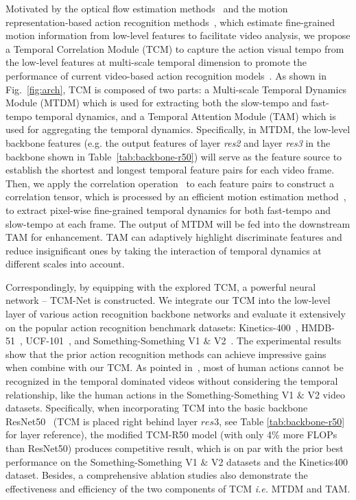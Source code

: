\documentclass[journal]{IEEEtran}
\begin{document}
Motivated by the optical flow estimation methods~\cite{tuDeepNLF,sun2018pwc,t2021liteflownet} and the motion representation-based action recognition methods~\cite{piergiovanni2019representation,kwon2020motionsqueeze,chen2020temporalc}, which estimate fine-grained motion information from low-level features to facilitate video analysis, we propose a Temporal Correlation Module (TCM) to capture the action visual tempo from the low-level features at multi-scale temporal dimension to promote the performance of current video-based action recognition models~\cite{zheng2020dynamic,ji2019context,liu2021tam}. 
As shown in Fig.~\ref{fig:arch}, TCM is composed of two parts: a Multi-scale Temporal Dynamics Module (MTDM) which is used for extracting both the slow-tempo and fast-tempo temporal dynamics, and a Temporal Attention Module (TAM) which is used for aggregating the temporal dynamics. Specifically, in MTDM, the low-level backbone features (e.g. the output features of layer \textit{res2} and layer \textit{res3} in the backbone shown in Table~\ref{tab:backbone-r50}) will serve as the feature source to establish the shortest and longest temporal feature pairs for each video frame. Then, we apply the correlation operation~\cite{dosovitskiy2015flownet} to each feature pairs to construct a correlation tensor, which is processed by an efficient motion estimation method~\cite{kwon2020motionsqueeze}, to extract pixel-wise fine-grained temporal dynamics for both fast-tempo and slow-tempo at each frame. The output of MTDM will be fed into the downstream TAM for enhancement. TAM can adaptively highlight discriminate features and reduce insignificant ones by taking the interaction of temporal dynamics at different scales into account.

Correspondingly, by equipping with the explored TCM, a powerful neural network -- TCM-Net is constructed. We integrate our TCM into the low-level layer of various action recognition backbone networks and evaluate it extensively on the popular action recognition benchmark datasets: Kinetics-400~\cite{kay2017kinetics}, HMDB-51~\cite{Kuehne11}, UCF-101~\cite{soomro2012ucf101}, and Something-Something V1 $\&$ V2~\cite{goyal2017something}. The experimental results show that the prior action recognition methods can achieve impressive gains when combine with our TCM. As pointed in~\cite{jiang2019stm, li2020tea,lin2019tsm}, most of human actions cannot be recognized in the temporal dominated videos without considering the temporal relationship, like the human actions in the Something-Something V1 $\&$ V2 video datasets. Specifically, when incorporating TCM into the basic backbone ResNet50~\cite{he2016deep} (TCM is placed right behind layer $res3$, see Table \ref{tab:backbone-r50} for layer reference), the modified TCM-R50 model (with only 4\% more FLOPs than ResNet50) produces competitive result, which is on par with the prior best performance on the Something-Something V1 $\&$ V2 datasets and the Kinetics400 dataset. Besides, a comprehensive ablation studies also demonstrate the effectiveness and efficiency of the two components of TCM \textit{i.e.} MTDM and TAM.
\end{document}
